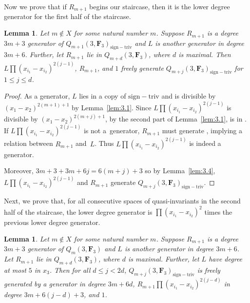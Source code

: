 \documentclass[11pt]{article}
\numberwithin{equation}{section}
\newtheorem{Lemma}[Theorem]{Lemma}
\theoremstyle{definition}
\numberwithin{equation}{section}
\newcommand{\siv}{\mathrm{sign-triv}}
\begin{document}
Now we prove that if $R_{m+1}$ begins our staircase, then it is the lower degree generator for the first half of the staircase.

\begin{Lemma}\label{higerGen}
 Let $m\not\in X$ for some natural number $m$. Suppose $R_{m+1}$ is a degree $3m+3$ generator of $Q_{m+1}(3,\mathbf{F}_3)_{\siv}$ and $L$ is another generator in degree $3m+6$. Further, let $R_{m+1}$ lie in $Q_{m+d}(3,\mathbf{F}_3)$, where $d$ is maximal. Then $L\prod(x_{i_1}-x_{i_2})^{2(j-1)}$, $R_{m+1}$, and $1$ freely generate $Q_{m+j}(3,\mathbf{F}_3)_{\siv}$ for $1\leq j \leq d$.
\end{Lemma}
\begin{proof}
 As a generator, $L$ lies in a copy of $\siv$ and is divisible by $(x_1-x_2)^{2(m+1)+1}$ by Lemma~\ref{lem:3.1}. Since $L\prod(x_{i_1}-x_{i_2})^{2(j-1)}$ is divisible by $(x_1-x_2)^{2(m+j)+1}$, by the second part of Lemma~\ref{lem:3.1},  is in \smash{$Q_{m+j}(3,\mathbf{F}_3)_{\siv}$}. If $L\prod(x_{i_1}-x_{i_2})^{2(j-1)}$ is not a~generator, $R_{m+1}$ must generate , implying a relation between $R_{m+1}$ and~$L$. Thus $L\prod(x_{i_1}-x_{i_2})^{2(j-1)}$ is indeed a generator.

 Moreover, $3m+3+3m+6j=6(m+j)+3$ so by Lemma~\ref{lem:3.4}, $L\prod(x_{i_1}-x_{i_2})^{2(j-1)}$ and $R_{m+1}$ generate $Q_{m+j}(3,\mathbf{F}_3)_{\siv}$.
\end{proof}

Next, we prove that, for all consecutive spaces of quasi-invariants in the second half of the staircase, the lower degree generator is $\prod (x_{i_1}-x_{i_2})^{2}$ times the previous lower degree generator.

\begin{Lemma}\label{lowerGen}
 Let $m\not\in X$ for some natural number $m$. Suppose $R_{m+1}$ is a degree $3m+3$ generator of $Q_m(3,\mathbf{F}_3)$ and $L$ is another generator in degree $3m+6$. Let $R_{m+1}$ lie in $Q_{m+d}(3,\mathbf{F}_3)$, where $d$ is maximal. Further, let $L$ have degree at most $5$ in $x_3$. Then for all $d\leq j< 2d$, $Q_{m+j}(3,\mathbf{F}_3)_{\siv}$ is freely generated by a generator in degree $3m+6d$, $R_{m+1}\prod(x_{i_1}-x_{i_2})^{2(j-d)}$ in degree $3m+6(j-d)+3$, and $1$.
\end{Lemma}
\end{document}

